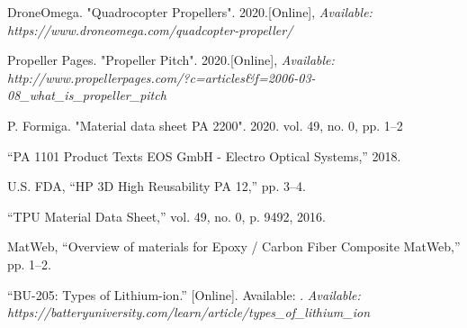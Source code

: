 \begin{spacing}{2}
\renewcommand\bibname{References}
\begin{thebibliography}{1}
	\vspace{1cm}
	
	DroneOmega. "Quadrocopter Propellers". 2020.[Online],	
	\textit{Available: https://www.droneomega.com/quadcopter-propeller/}
	
	Propeller Pages. "Propeller Pitch". 2020.[Online],	
	\textit{Available: http://www.propellerpages.com/?c=articles\&f=2006-03-08\_what\_is\_propeller\_pitch}
	
	P. Formiga. "Material data sheet PA 2200". 2020. vol. 49, no. 0, pp. 1–2
	
	“PA 1101 Product Texts EOS GmbH - Electro Optical Systems,” 2018.
	
	U.S. FDA, “HP 3D High Reusability PA 12,” pp. 3–4.
	
	“TPU Material Data Sheet,” vol. 49, no. 0, p. 9492, 2016.
	
	MatWeb, “Overview of materials for Epoxy / Carbon Fiber Composite MatWeb,” pp. 1–2.
	
	“BU-205: Types of Lithium-ion.” [Online]. Available: .	
	\textit{Available: https://batteryuniversity.com/learn/article/types\_of\_lithium\_ion}


\end{thebibliography}
\end{spacing}
